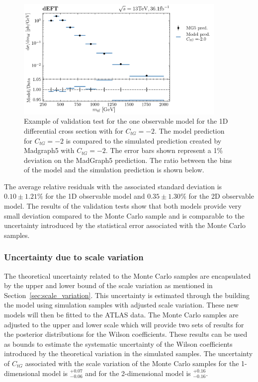 \documentclass[a4paper,11pt]{article}
\begin{document}
\begin{figure}[htb]
    \centering
    \includegraphics[width=0.9\textwidth]{plots/validation_ATLAS-ctg_2_1D_1OP.png}
    \caption{Example of validation test for the one observable model for the 1D differential cross section with for $C_{tG}=-2$. The model prediction for $C_{tG}=-2$ is compared to the simulated prediction created by Madgraph5 with $C_{tG}=-2$. The error bars shown represent a 1\% deviation on the MadGraph5 prediction. The ratio between the bins of the model and the simulation prediction is shown below.}
    \label{fig:test_example}
\end{figure}

The average relative residuals with the associated standard deviation is $0.10\pm1.21\%$ for the 1D observable model and $0.35\pm1.30\%$ for the 2D observable model.
The results of the validation tests show that both models provide very small deviation compared to the Monte Carlo sample and is comparable to the uncertainty introduced by the statistical error associated with the Monte Carlo samples.

\subsubsection{Uncertainty due to scale variation}
The theoretical uncertainty related to the Monte Carlo samples are encapsulated by the upper and lower bound of the scale variation as mentioned in Section~\ref{sec:scale_variation}.
This uncertainty is estimated through the building the model using simulation samples with adjusted scale variation.
These new models will then be fitted to the ATLAS data.
The Monte Carlo samples are adjusted to the upper and lower scale which will provide two sets of results for the posterior distributions for the Wilson coefficients.
These results can be used as bounds to estimate the systematic uncertainty of the Wilson coefficients introduced by the theoretical variation in the simulated samples.
The uncertainty of $C_{tG}$ associated with the scale variation of the Monte Carlo samples for the 1-dimensional model is $^{+0.07}_{-0.06}$ and for the 2-dimensional model is $^{+0.16}_{-0.16}$.
\end{document}
